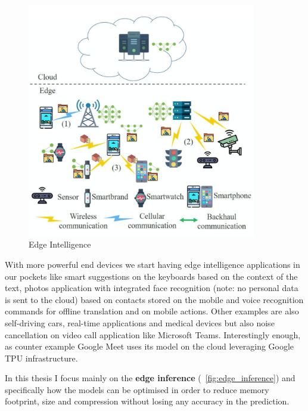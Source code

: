 \begin{figure}[ht]
    \includegraphics[width=10cm]{images/introduction/edge_intelligence.png}
    \centering
    \caption{Edge Intelligence}\label{fig:edge_intelligence}
\end{figure}

With more powerful end devices we start having edge intelligence applications
in our pockets like smart suggestions on the keyboards based on the context of
the text, photos application with integrated face recognition (note: no
personal data is sent to the cloud) based on contacts stored on the mobile and
voice recognition commands for offline translation and on mobile actions.
Other examples are also self-driving cars, real-time applications and medical
devices but also noise cancellation on video call application like Microsoft
Teams. Interestingly enough, as counter example Google Meet uses its model on
the cloud leveraging Google TPU infrastructure.

In this thesis I focus mainly on the \textbf{edge inference} (~\ref{fig:edge_inference})
and specifically how the models can be optimised in order to reduce memory
footprint, size and compression without losing any accuracy in the prediction.

